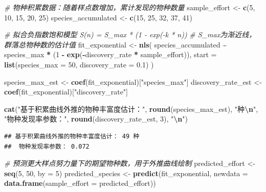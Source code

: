 \documentclass[
  twoside,12pt,fontset=none]{ctexbook}
\newenvironment{Shaded}{\begin{snugshade}}{\end{snugshade}}
\newcommand{\AttributeTok}[1]{\textcolor[rgb]{0.13,0.29,0.53}{#1}}
\newcommand{\CommentTok}[1]{\textcolor[rgb]{0.56,0.35,0.01}{\textit{#1}}}
\newcommand{\DecValTok}[1]{\textcolor[rgb]{0.00,0.00,0.81}{#1}}
\newcommand{\FloatTok}[1]{\textcolor[rgb]{0.00,0.00,0.81}{#1}}
\newcommand{\FunctionTok}[1]{\textcolor[rgb]{0.13,0.29,0.53}{\textbf{#1}}}
\newcommand{\NormalTok}[1]{#1}
\newcommand{\OtherTok}[1]{\textcolor[rgb]{0.56,0.35,0.01}{#1}}
\newcommand{\SpecialCharTok}[1]{\textcolor[rgb]{0.81,0.36,0.00}{\textbf{#1}}}
\newcommand{\StringTok}[1]{\textcolor[rgb]{0.31,0.60,0.02}{#1}}
\begin{document}
\begin{Shaded}
\begin{Highlighting}[]
\CommentTok{\# 物种积累数据：随着样点数增加，累计发现的物种数量}
\NormalTok{sample\_effort }\OtherTok{\textless{}{-}} \FunctionTok{c}\NormalTok{(}\DecValTok{5}\NormalTok{, }\DecValTok{10}\NormalTok{, }\DecValTok{15}\NormalTok{, }\DecValTok{20}\NormalTok{, }\DecValTok{25}\NormalTok{)}
\NormalTok{species\_accumulated }\OtherTok{\textless{}{-}} \FunctionTok{c}\NormalTok{(}\DecValTok{15}\NormalTok{, }\DecValTok{25}\NormalTok{, }\DecValTok{32}\NormalTok{, }\DecValTok{37}\NormalTok{, }\DecValTok{41}\NormalTok{)}

\CommentTok{\# 拟合负指数饱和模型 S(n) = S\_max * (1 {-} exp({-}k * n))}
\CommentTok{\# S\_max为渐近线，群落总物种数的估计值}
\NormalTok{fit\_exponential }\OtherTok{\textless{}{-}} \FunctionTok{nls}\NormalTok{(}
\NormalTok{  species\_accumulated }\SpecialCharTok{\textasciitilde{}}\NormalTok{ species\_max }\SpecialCharTok{*}
\NormalTok{    (}\DecValTok{1} \SpecialCharTok{{-}} \FunctionTok{exp}\NormalTok{(}\SpecialCharTok{{-}}\NormalTok{discovery\_rate }\SpecialCharTok{*}\NormalTok{ sample\_effort)),}
  \AttributeTok{start =} \FunctionTok{list}\NormalTok{(}\AttributeTok{species\_max =} \DecValTok{50}\NormalTok{, }\AttributeTok{discovery\_rate =} \FloatTok{0.1}\NormalTok{)}
\NormalTok{)}

\NormalTok{species\_max\_est }\OtherTok{\textless{}{-}} \FunctionTok{coef}\NormalTok{(fit\_exponential)[}\StringTok{"species\_max"}\NormalTok{]}
\NormalTok{discovery\_rate\_est }\OtherTok{\textless{}{-}} \FunctionTok{coef}\NormalTok{(fit\_exponential)[}\StringTok{"discovery\_rate"}\NormalTok{]}

\FunctionTok{cat}\NormalTok{(}\StringTok{"基于积累曲线外推的物种丰富度估计："}\NormalTok{, }\FunctionTok{round}\NormalTok{(species\_max\_est), }\StringTok{"种}\SpecialCharTok{\textbackslash{}n}\StringTok{"}\NormalTok{,}
  \StringTok{"物种发现率参数："}\NormalTok{, }\FunctionTok{round}\NormalTok{(discovery\_rate\_est, }\DecValTok{3}\NormalTok{), }\StringTok{"}\SpecialCharTok{\textbackslash{}n}\StringTok{"}\NormalTok{)}
\end{Highlighting}
\end{Shaded}

\begin{verbatim}
## 基于积累曲线外推的物种丰富度估计： 49 种
##  物种发现率参数： 0.072
\end{verbatim}

\begin{Shaded}
\begin{Highlighting}[]
\CommentTok{\# 预测更大样点努力量下的期望物种数，用于外推曲线绘制}
\NormalTok{predicted\_effort }\OtherTok{\textless{}{-}} \FunctionTok{seq}\NormalTok{(}\DecValTok{5}\NormalTok{, }\DecValTok{50}\NormalTok{, }\AttributeTok{by =} \DecValTok{5}\NormalTok{)}
\NormalTok{predicted\_species }\OtherTok{\textless{}{-}} \FunctionTok{predict}\NormalTok{(fit\_exponential,}
  \AttributeTok{newdata =} \FunctionTok{data.frame}\NormalTok{(}\AttributeTok{sample\_effort =}\NormalTok{ predicted\_effort))}
\end{Highlighting}
\end{Shaded}
\end{document}
